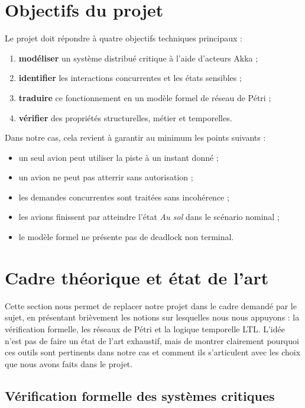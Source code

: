 \documentclass[11pt,a4paper]{article}
\begin{document}
\section{Objectifs du projet}

Le projet doit répondre à quatre objectifs techniques principaux :
\begin{enumerate}
    \item \textbf{modéliser} un système distribué critique à l'aide d'acteurs Akka ;
    \item \textbf{identifier} les interactions concurrentes et les états sensibles ;
    \item \textbf{traduire} ce fonctionnement en un modèle formel de réseau de Pétri ;
    \item \textbf{vérifier} des propriétés structurelles, métier et temporelles.
\end{enumerate}

Dans notre cas, cela revient à garantir au minimum les points suivants :
\begin{itemize}
    \item un seul avion peut utiliser la piste à un instant donné ;
    \item un avion ne peut pas atterrir sans autorisation ;
    \item les demandes concurrentes sont traitées sans incohérence ;
    \item les avions finissent par atteindre l'état \emph{Au sol} dans le scénario nominal ;
    \item le modèle formel ne présente pas de deadlock non terminal.
\end{itemize}

\section{Cadre théorique et état de l'art}

Cette section nous permet de replacer notre projet dans le cadre demandé par le sujet, en présentant brièvement les notions sur lesquelles nous nous appuyons : la vérification formelle, les réseaux de Pétri et la logique temporelle LTL. L'idée n'est pas de faire un état de l'art exhaustif, mais de montrer clairement pourquoi ces outils sont pertinents dans notre cas et comment ils s'articulent avec les choix que nous avons faits dans le projet.

\subsection{Vérification formelle des systèmes critiques}
\end{document}
